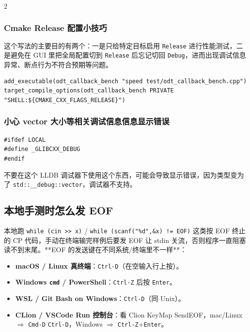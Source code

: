 \begin{multicols*}{2}
	\subsubsection{Cmake Release 配置小技巧}

	这个写法的主要目的有两个：一是只给特定目标启用 \texttt{Release} 进行性能测试，二是避免在 GUI 里把全局配置切到 \texttt{Release} 后忘记切回 \texttt{Debug}，进而出现调试信息异常、断点行为不符合预期等问题。

	\begin{verbatim}
add_executable(odt_callback_bench "speed test/odt_callback_bench.cpp")
target_compile_options(odt_callback_bench PRIVATE "SHELL:${CMAKE_CXX_FLAGS_RELEASE}")
	\end{verbatim}

	\subsubsection{小心 vector 大小等相关调试信息信息显示错误}

	\begin{verbatim}
#ifdef LOCAL
#define _GLIBCXX_DEBUG
#endif
	\end{verbatim}

	不要在这个 LLDB 调试器下使用这个东西，可能会导致显示错误，因为类型变为了 \texttt{std::\_\_debug::vector}，调试器不支持。
	\subsection{本地手测时怎么发 EOF}

	本地跑 \texttt{while (cin >> x)} / \texttt{while (scanf("\%d",\&x) != EOF)} 这类按 EOF 终止的 CP 代码，手动在终端输完样例后要发 EOF 让 stdin 关流，否则程序一直阻塞读不到末尾。**EOF 的发送键在不同系统/终端里不一样**：

	\begin{itemize}
		\item \textbf{macOS / Linux 真终端}：\texttt{Ctrl-D}（在空输入行上按）。
		\item \textbf{Windows \texttt{cmd} / PowerShell}：\texttt{Ctrl-Z} 后按 \texttt{Enter}。
		\item \textbf{WSL / Git Bash on Windows}：\texttt{Ctrl-D}（同 Unix）。
		\item \textbf{CLion / VSCode Run 控制台}：看 Clion KeyMap SendEOF，mac/Linux $\Rightarrow$ \texttt{Cmd-D} \texttt{Ctrl-D}，Windows $\Rightarrow$ \texttt{Ctrl-Z}+\texttt{Enter}。
	\end{itemize}
%
%
%


\end{multicols*}
